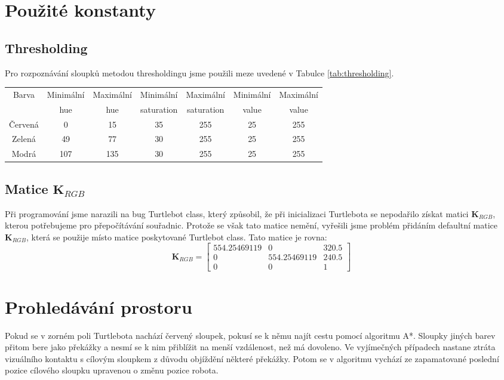 \documentclass{article}
\begin{document}
\section{Použité konstanty}
\subsection{Thresholding}
Pro rozpoznávání sloupků metodou thresholdingu jsme použili meze uvedené v Tabulce \ref{tab:thresholding}.
\begin{center}
 \label{tab:thresholding} 
 \begin{tabular}{|c | c | c | c| c|c|c |}
 \hline
Barva & Minimální & Maximální & Minimální & Maximální & Minimální & Maximální \\
 & hue & hue & saturation & saturation & value & value\\
\hline
Červená & 0 & 15 & 35 & 255 & 25 & 255\\
\hline
Zelená & 49 & 77 & 30 & 255 & 25 & 255\\
\hline
Modrá & 107 & 135 & 30 & 255 & 25 & 255\\
\hline
\end{tabular}
\end{center}
\subsection{Matice \texorpdfstring{$\mathbf{K}_{RGB}$}{KRGB}}
Při programování jsme narazili na bug Turtlebot class, který způsobil, že při inicializaci Turtlebota se nepodařilo získat matici $\mathbf{K}_{RGB}$, kterou potřebujeme pro přepočítávání souřadnic. Protože se však tato matice nemění, vyřešili jsme problém přidáním defaultní matice  $\mathbf{K}_{RGB}$, která se použije místo matice poskytované Turtlebot class. Tato matice je rovna:
$$
\mathbf{K}_{RGB} = 
\begin{bmatrix}
554.25469119 & 0 & 320.5 \\
0 & 554.25469119 & 240.5 \\
0 & 0 & 1
\end{bmatrix}
$$
\section{Prohledávání prostoru}
Pokud se v zorném poli Turtlebota nachází červený sloupek, pokusí se k němu najít cestu pomocí algoritmu A*. Sloupky jiných barev přitom bere jako překážky a nesmí se k nim přiblížit na menší vzdálenost, než má dovoleno. Ve vyjímečných případech nastane ztráta vizuálního kontaktu s cílovým sloupkem z důvodu objíždění některé překážky. Potom se v algoritmu vychází ze zapamatované poslední pozice cílového sloupku upravenou o změnu pozice robota.
\end{document}
